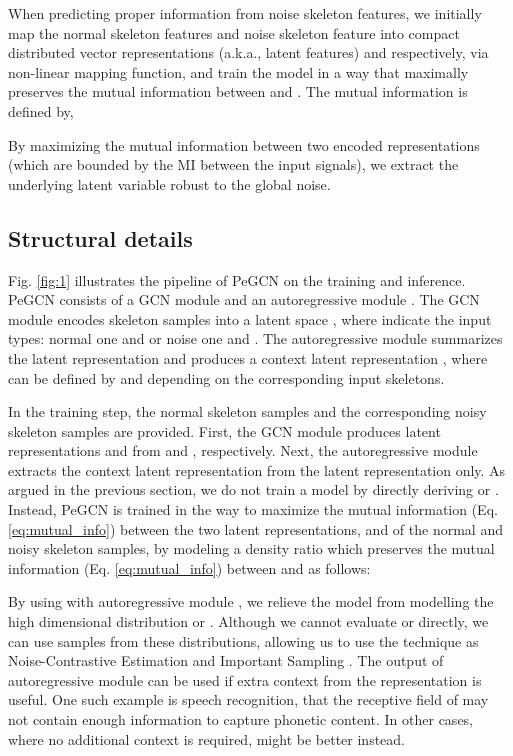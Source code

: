 \documentclass[runningheads]{llncs}
\begin{document}
When predicting proper information from noise skeleton features, we initially map the normal skeleton features  and noise skeleton feature  into compact distributed vector representations (a.k.a., latent features)  and  respectively, via non-linear mapping function, and train the model in a way that maximally preserves the mutual information between  and . The mutual information is defined by, 

By maximizing the mutual information between two encoded representations (which are bounded by the MI between the input signals), we extract the underlying latent variable robust to the global noise. 

\subsection{Structural details}
Fig. \ref{fig:1} illustrates the pipeline of PeGCN on the training and inference. PeGCN consists of a GCN module  and an autoregressive module . The GCN module  encodes skeleton samples into a latent space , where  indicate the input types: normal one  and  or noise one  and . The autoregressive module  summarizes the latent representation and produces a context latent representation , where  can be defined by  and  depending on the corresponding input skeletons. 

In the training step, the normal skeleton samples  and the corresponding noisy skeleton samples  are provided. First, the GCN module  produces latent representations  and  from  and , respectively. Next, the autoregressive module  extracts the context latent representation  from the latent representation  only. As argued in the previous section, we do not train a model by directly deriving  or . Instead, PeGCN is trained in the way to maximize the mutual information (Eq. \ref{eq:mutual_info}) between the two latent representations,  and  of the normal and noisy skeleton samples, by modeling a density ratio which preserves the mutual information (Eq. \ref{eq:mutual_info}) between  and  as follows:

By using  with autoregressive module , we relieve the model from modelling the high dimensional distribution  or . Although we cannot evaluate  or  directly, we can use samples from these distributions, allowing us to use the technique as Noise-Contrastive Estimation \cite{gutmann2010noise,mnih2012fast,jozefowicz2016exploring} and Important Sampling \cite{bengio2008adaptive}. The output of autoregressive module  can be used if extra context from the representation is useful. One such example is speech recognition, that the receptive field of  may not contain enough information to capture phonetic content. In other cases, where no additional context is required,  might be better instead. 
\end{document}

